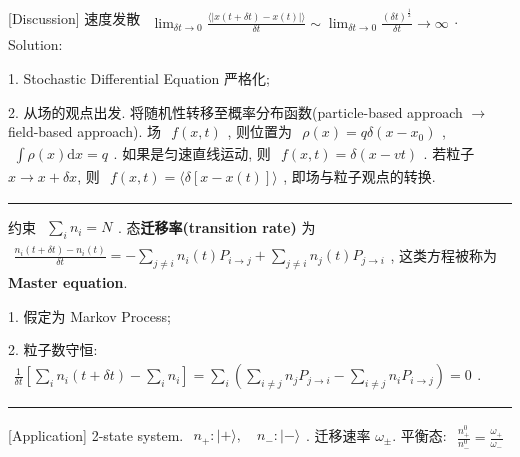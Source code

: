 \documentclass[../../main.tex]{subfiles}
\begin{document}
[Discussion] 速度发散 $\begin{aligned}
    \lim_{\delta t\rightarrow 0}\frac{\langle |x(t+\delta t)-x(t)|\rangle}{\delta t} \sim \lim_{\delta t\rightarrow 0}\frac{(\delta t)^{\frac{1}{2}}}{\delta t}\rightarrow \infty
\end{aligned}$. Solution: 

1. Stochastic Differential Equation 严格化; 

2. 从场的观点出发. 将随机性转移至概率分布函数(particle-based approach $\rightarrow$ field-based approach). 场 $\begin{aligned}
    f(x,t)
\end{aligned}$, 则位置为 $\begin{aligned}
    \rho(x) = q\delta(x-x_{0})
\end{aligned}$, $\begin{aligned}
    \int\rho(x)\mathrm{d}x = q
\end{aligned}$. 如果是匀速直线运动, 则 $\begin{aligned}
    f(x,t) = \delta(x-vt)
\end{aligned}$. 若粒子 $x\rightarrow x+\delta x$, 则 $\begin{aligned}
    f(x,t) = \langle\delta[x-x(t)]\rangle
\end{aligned}$, 即场与粒子观点的转换. 

\vspace{0.5em}\hrule\vspace{0.5em}
约束 $\begin{aligned}
    \sum_{i}n_{i} = N
\end{aligned}$. 态\textbf{迁移率(transition rate)} 为 $\begin{aligned}
    \frac{n_{i}(t+\delta t)-n_{i}(t)}{\delta t} = -\sum_{j\neq i}n_{i}(t)P_{i\rightarrow j} + \sum_{j\neq i}n_{j}(t)P_{j\rightarrow i}
\end{aligned}$, 这类方程被称为 \textbf{Master equation}. 

1. 假定为 Markov Process; 

2. 粒子数守恒: $\begin{aligned}
    \frac{1}{\delta t}\left[\sum_{i}n_{i}(t+\delta t) - \sum_{i}n_{i}\right] = \sum_{i}\left(\sum_{i\neq j}n_{j}P_{j\rightarrow i} - \sum_{i\neq j}n_{i}P_{i\rightarrow j}\right) = 0
\end{aligned}$.

\vspace{0.5em}\hrule\vspace{0.5em}

[Application] 2-state system. $\begin{aligned}
    n_{+}: |+\rangle,\quad n_{-}: |-\rangle
\end{aligned}$. 迁移速率 $\omega_{\pm}$. 平衡态: $\begin{aligned}
    \frac{n_{+}^{0}}{n_{-}^{0}} = \frac{\omega_{+}}{\omega_{-}}
\end{aligned}$
\end{document}
